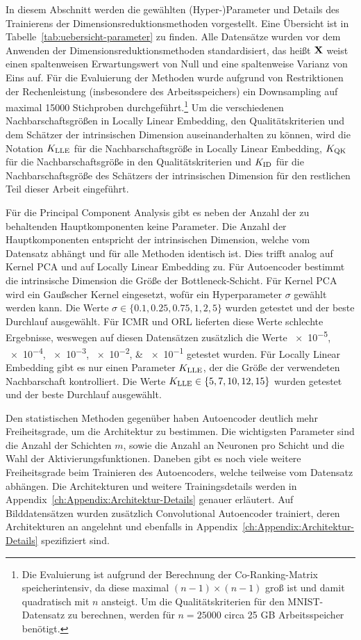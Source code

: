 In diesem Abschnitt werden die gewählten (Hyper-)Parameter und Details des Trainierens der
Dimensionsreduktionsmethoden vorgestellt. Eine Übersicht ist in
Tabelle~\ref{tab:uebersicht-parameter} zu finden. Alle Datensätze wurden vor dem Anwenden der
Dimensionsreduktionsmethoden standardisiert, das heißt $\mathbf{X}$ weist einen spaltenweisen
Erwartungswert von Null und eine spaltenweise Varianz von Eins auf. Für die Evaluierung der
Methoden wurde aufgrund von Restriktionen der Rechenleistung (insbesondere des Arbeitsspeichers)
ein Downsampling auf maximal \num{15000} Stichproben durchgeführt.\footnote{Die Evaluierung ist
	aufgrund der Berechnung der Co-Ranking-Matrix speicherintensiv, da diese maximal $(n-1) \times
		(n-1)$ groß ist und damit quadratisch mit $n$ ansteigt. Um die Qualitätskriterien für den
	MNIST-Datensatz zu berechnen, werden für $n=\num{25000}$ circa 25 GB Arbeitsspeicher benötigt.} Um
die verschiedenen Nachbarschaftsgrößen in Locally Linear Embedding, den Qualitätskriterien und dem
Schätzer der intrinsischen Dimension auseinanderhalten zu können, wird die Notation $K_{\text{LLE}}$ für die
Nachbarschaftsgröße in Locally Linear Embedding, $K_{\text{QK}}$ für die Nachbarschaftsgröße in den
Qualitätskriterien und $K_{\text{ID}}$ für die Nachbarschaftsgröße des Schätzers der intrinsischen Dimension
für den restlichen Teil dieser Arbeit eingeführt.

Für die Principal Component Analysis gibt es neben der Anzahl der zu behaltenden Hauptkomponenten
keine Parameter. Die Anzahl der Hauptkomponenten entspricht der intrinsischen Dimension, welche vom
Datensatz abhängt und für alle Methoden identisch ist. Dies trifft analog auf Kernel PCA und auf
Locally Linear Embedding zu. Für Autoencoder bestimmt die intrinsische Dimension die Größe der
Bottleneck-Schicht. Für Kernel PCA wird ein Gaußscher Kernel eingesetzt, wofür ein Hyperparameter
$\sigma$ gewählt werden kann. Die Werte $\sigma \in \{ 0.1, 0.25, 0.75, 1, 2, 5\}$ wurden getestet
und der beste Durchlauf ausgewählt. Für ICMR und ORL lieferten diese Werte schlechte Ergebnisse,
weswegen auf diesen Datensätzen zusätzlich die Werte \numlist{e-5;e-4;e-3;e-2;e-1} getestet wurden.
Für Locally Linear Embedding gibt es nur einen Parameter $K_{\text{LLE}}$, der die Größe der verwendeten
Nachbarschaft kontrolliert. Die Werte $K_{\text{LLE}} \in \{ 5, 7, 10, 12, 15\}$ wurden getestet und der
beste Durchlauf ausgewählt.

Den statistischen Methoden gegenüber haben Autoencoder deutlich mehr Freiheitsgrade, um die
Architektur zu bestimmen. Die wichtigsten Parameter sind die Anzahl der Schichten $m$, sowie die
Anzahl an Neuronen pro Schicht und die Wahl der Aktivierungsfunktionen. Daneben gibt es noch viele
weitere Freiheitsgrade beim Trainieren des Autoencoders, welche teilweise vom Datensatz abhängen.
Die Architekturen und weitere Trainingsdetails werden in
Appendix~\ref{ch:Appendix:Architektur-Details} genauer erläutert. Auf Bilddatensätzen wurden
zusätzlich Convolutional Autoencoder trainiert, deren Architekturen an \textcite[14]{Ghosh.2019}
angelehnt und ebenfalls in Appendix~\ref{ch:Appendix:Architektur-Details} spezifiziert sind.

